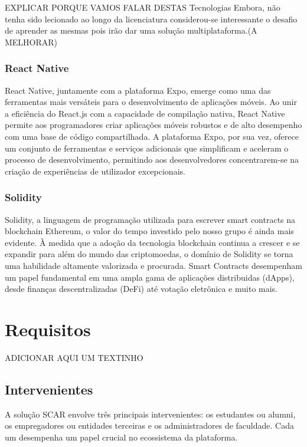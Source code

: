 \documentclass[10pt]{article}
\begin{document}
EXPLICAR PORQUE VAMOS FALAR DESTAS Tecnologias
Embora, não tenha sido lecionado ao longo da licenciatura considerou-se interessante o desafio de aprender
as mesmas pois irão dar uma solução multiplataforma.(A MELHORAR)

\subsubsection*{React Native}

React Native, juntamente com a plataforma Expo, emerge como uma das ferramentas mais versáteis
para o desenvolvimento de aplicações móveis. Ao unir a eficiência do React.js com a capacidade de compilação
nativa, React Native permite aos programadores criar aplicações móveis robustos e de alto desempenho
com uma base de código compartilhada. A plataforma Expo, por sua vez, oferece um conjunto de ferramentas
e serviços adicionais que simplificam e aceleram o processo de desenvolvimento, permitindo aos desenvolvedores
concentrarem-se na criação de experiências de utilizador excepcionais.

\subsubsection*{Solidity}

Solidity, a linguagem de programação utilizada para escrever smart contracts na blockchain Ethereum,
o valor do tempo investido pelo nosso grupo é ainda mais evidente. À medida que a adoção da tecnologia
blockchain continua a crescer e se expandir para além do mundo das criptomoedas, o domínio de Solidity se
torna uma habilidade altamente valorizada e procurada. Smart Contracts desempenham um papel fundamental em
uma ampla gama de aplicações distribuidas (dApps), desde finanças descentralizadas (DeFi) até votação eletrônica
e muito mais.

\section{Requisitos}

ADICIONAR AQUI UM TEXTINHO

\subsection*{Intervenientes}

A solução SCAR envolve três principais intervenientes: os estudantes ou alumni, os empregadores ou entidades terceiras e os administradores
de faculdade. Cada um desempenha um papel crucial no ecossistema da plataforma.
\end{document}
